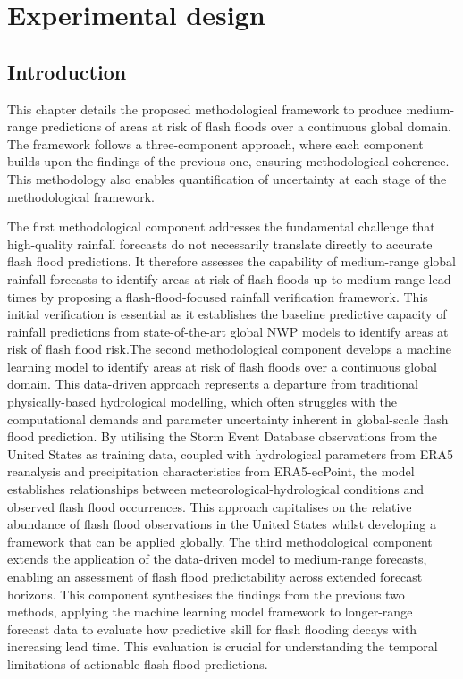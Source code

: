 \chapter{Experimental design}


\section{Introduction}

This chapter details the proposed methodological framework to produce medium-range predictions of areas at risk of flash floods over a continuous global domain. The framework follows a three-component approach, where each component builds upon the findings of the previous one, ensuring methodological coherence. This methodology also enables quantification of uncertainty at each stage of the methodological framework.

The first methodological component addresses the fundamental challenge that high-quality rainfall forecasts do not necessarily translate directly to accurate flash flood predictions. It therefore assesses the capability of medium-range global rainfall forecasts to identify areas at risk of flash floods up to medium-range lead times by proposing a flash-flood-focused rainfall verification framework. This initial verification is essential as it establishes the baseline predictive capacity of rainfall predictions from state-of-the-art global NWP models to identify areas at risk of flash flood risk.The second methodological component develops a machine learning model to identify areas at risk of flash floods over a continuous global domain. This data-driven approach represents a departure from traditional physically-based hydrological modelling, which often struggles with the computational demands and parameter uncertainty inherent in global-scale flash flood prediction. By utilising the Storm Event Database observations from the United States as training data, coupled with hydrological parameters from ERA5 reanalysis and precipitation characteristics from ERA5-ecPoint, the model establishes relationships between meteorological-hydrological conditions and observed flash flood occurrences. This approach capitalises on the relative abundance of flash flood observations in the United States whilst developing a framework that can be applied globally.
The third methodological component extends the application of the data-driven model to medium-range forecasts, enabling an assessment of flash flood predictability across extended forecast horizons. This component synthesises the findings from the previous two methods, applying the machine learning model framework to longer-range forecast data to evaluate how predictive skill for flash flooding decays with increasing lead time. This evaluation is crucial for understanding the temporal limitations of actionable flash flood predictions.

